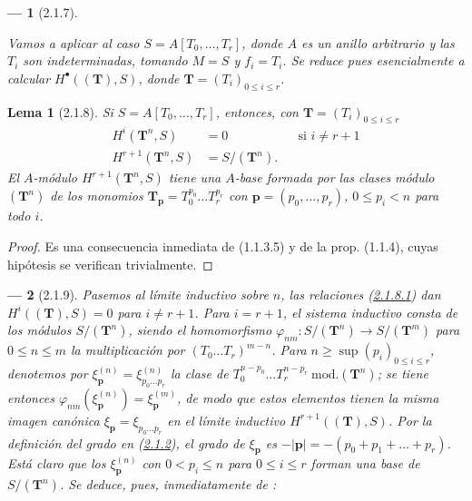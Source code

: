 \documentclass[10pt,oneside,openany]{book}
\theoremstyle{egaenv}\newtheorem*{env}{---}
\theoremstyle{egastatement}
\newtheorem*{lemma}{Lema}
\theoremstyle{egadescription}
\renewcommand{\leq}{\leqslant}
\renewcommand{\geq}{\geqslant}
\begin{document}
\begin{env}[2.1.7]
\label{III.2.1.7}
\label{III.2.1.7-fr}

Vamos a aplicar  al caso $S=A[T_0,\ldots,T_r]$, donde $A$ es un anillo arbitrario y las $T_i$ son indeterminadas, tomando $M=S$ y $f_i=T_i$. Se reduce pues esencialmente a calcular $H^\bullet((\mathbf T),S)$, donde $\mathbf T=(T_i)_{0\leq i\leq r}$.
\end{env}

\begin{lemma}[2.1.8]
\label{III.2.1.8}
\label{III.2.1.8-fr}
Si $S=A[T_0,\ldots,T_r]$, entonces, con $\mathbf T=(T_i)_{0\leq i\leq r}$
\begin{align}
\label{III.2.1.8.1-fr}
\tag{2.1.8.1}
H^i(\mathbf T^n,S)&=0 &&\text{si }i\neq r+1\\
\label{III.2.1.8.2-fr}
\tag{2.1.8.2}
H^{r+1}(\mathbf T^n,S)&=S/(\mathbf T^n).
\end{align}
El $A$-módulo $H^{r+1}(\mathbf T^n,S)$ tiene una $A$-base formada por las clases módulo $(\mathbf T^n)$ de los monomios
$\mathbf T_{\mathbf p}=T_0^{p_0}\ldots T_r^{p_r}$ con
$\mathbf p=(p_0,\ldots,p_r)$, $0\leq p_i<n$ para todo $i$.
\end{lemma}

\begin{proof}
Es una consecuencia inmediata de (1.1.3.5) y de la prop. (1.1.4), cuyas
hipótesis se verifican trivialmente.
\end{proof}

\begin{env}[2.1.9]
\label{III.2.1.9-fr}
Pasemos al límite inductivo sobre $n$, las relaciones (\hyperref[III.2.1.8.1]{2.1.8.1}) dan $H^i((\mathbf T),S)=0$ para $i\neq r+1$.
Para $i=r+1$, el sistema inductivo consta de los módulos $S/(\mathbf T^n)$, siendo el homomorfismo
$\varphi_{nm}:S/(\mathbf T^n)\longrightarrow S/(\mathbf T^m)$
para $0\leq n\leq m$
la multiplicación por $(T_0\ldots T_r)^{m-n}$.
Para $n\geq\sup(p_i)_{0\leq i\leq r}$, denotemos por $\xi_{\mathbf p}^{(n)}=\xi_{p_0\ldots p_r}^{(n)}$ la clase de
$T_0^{n-p_0}\ldots T_r^{n-p_r}\ \mathrm{mod.}(\mathbf T^n)$; se tiene entonces
$\varphi_{nm}(\xi_{\mathbf p}^{(n)})=\xi_{\mathbf p}^{(m)}$, de modo que estos elementos tienen la misma imagen canónica $\xi_{\mathbf p}=\xi_{p_0\ldots p_r}$ en el límite inductivo $H^{r+1}((\mathbf T),S)$.
Por la definición del grado en (\hyperref[III.2.1.2]{2.1.2}), el grado de $\xi_{\mathbf p}$ es $-|\mathbf p|=-(p_0+p_1+\ldots+p_r)$.
Está claro que los $\xi_{\mathbf p}^{(n)}$ con $0<p_i\leq n$ para $0\leq i\leq r$ forman una base de $S/(\mathbf T^n)$.
Se deduce, pues, inmediatamente de :
\end{env}
\end{document}
